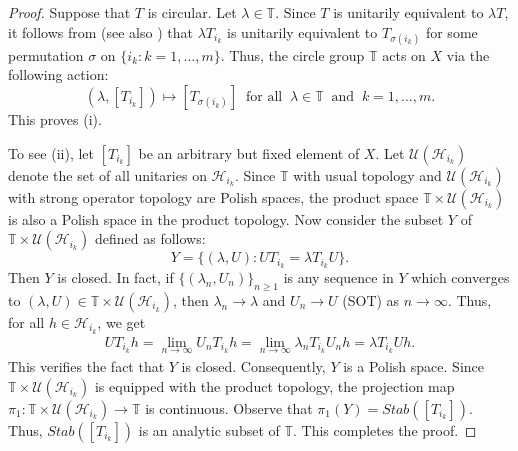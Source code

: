\documentclass[a4paper,oneside,10pt, reqno]{amsproc}
\theoremstyle{remark}
\theoremstyle{definition}
\newcommand{\beqn}{\begin{eqnarray*}}
\newcommand{\eeqn}{\end{eqnarray*}}
\begin{document}
\begin{proof}
Suppose that $T$ is circular. Let $\lambda \in \mathbb T$. Since $T$ is unitarily equivalent to $\lambda T$, it follows from \cite[Theorem 3.1]{FJW} (see also \cite[Proposition 3.4]{FJW}) that $\lambda T_{i_k}$ is unitarily equivalent to $T_{\sigma(i_k)}$ for some permutation $\sigma$ on $\{i_k : k = 1, \ldots, m\}$. Thus, the circle group $\mathbb T$ acts on $X$ via the following action:
\[(\lambda, [T_{i_k}]) \mapsto [T_{\sigma(i_k)}]\ \text{ for all }\ \lambda \in \mathbb T \ \text{ and }\ k = 1, \ldots, m.\]
This proves (i).

To see (ii), let $[T_{i_k}]$ be an arbitrary but fixed element of $X$. Let $\mathcal U(\mathcal H_{i_k})$ denote the set of all unitaries on $\mathcal H_{i_k}$. Since $\mathbb T$ with usual topology and $\mathcal U(\mathcal H_{i_k})$ with strong operator topology are Polish spaces, the product space $\mathbb T \times \mathcal U(\mathcal H_{i_k})$ is also a Polish space in the product topology. Now consider the subset $Y$ of $\mathbb T \times \mathcal U(\mathcal H_{i_k})$ defined as follows:
\[Y = \{(\lambda, U) : U T_{i_k} = \lambda T_{i_k} U\}.\]
Then $Y$ is closed. In fact, if $\{(\lambda_n, U_n)\}_{n \geqslant 1}$ is any sequence in $Y$ which converges to $(\lambda, U) \in \mathbb T \times \mathcal U(\mathcal H_{i_k})$, then $\lambda_n \to \lambda$ and $U_n \to U$ (SOT) as $n \to \infty$. Thus, for all $h \in \mathcal H_{i_k}$, we get
\beqn
U T_{i_k} h = \lim_{n \to \infty} U_n T_{i_k} h = \lim_{n \to \infty} \lambda_n T_{i_k} U_n h = \lambda T_{i_k} U h.
\eeqn
This verifies the fact that $Y$ is closed. Consequently, $Y$ is a Polish space. Since $\mathbb T \times \mathcal U(\mathcal H_{i_k})$ is equipped with the product topology, the projection map $\pi_1 : \mathbb T \times \mathcal U(\mathcal H_{i_k}) \to \mathbb T$ is continuous. Observe that $\pi_1(Y) = Stab([T_{i_k}])$. Thus, $Stab([T_{i_k}])$ is an analytic subset of $\mathbb T$. This completes the proof.
\end{proof}
\end{document}
